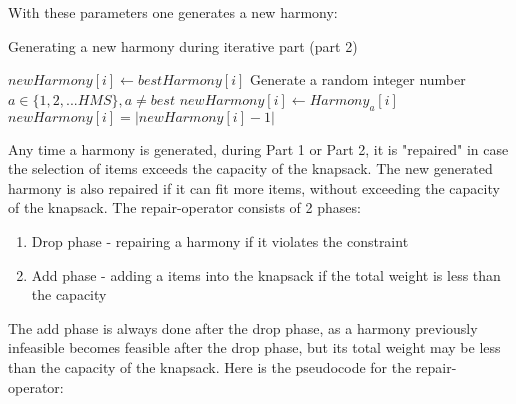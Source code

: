 \documentclass[titlepage]{article}
\begin{document}
With these parameters one generates a new harmony:

\begin{breakablealgorithm}
\caption{Generating a new harmony during iterative part (part 2)}\label{harmonyGen}
    \begin{algorithmic}[1]
                \State $newHarmony[i] \gets bestHarmony[i]$ 
            \Else
                \State Generate a random integer number $a \in \{1, 2, ... HMS\}, a \neq best$
                \State $newHarmony[i] \gets Harmony_{a}[i]$ 
                    \State $newHarmony[i] = |newHarmony[i]-1|$ 
                \EndIf
            \EndIf
        \EndFor
    \end{algorithmic}
\end{breakablealgorithm}


Any time a harmony is generated, during Part 1 or Part 2, it is "repaired" in case the selection of items exceeds the capacity of the knapsack. The new generated harmony is also repaired if it can fit more items, without exceeding the capacity of the knapsack. The repair-operator consists of 2 phases:
\begin{enumerate}
    \item Drop phase - repairing a harmony if it violates the constraint
    \item Add phase - adding a items into the knapsack if the total weight is less than the capacity
\end{enumerate}

The add phase is always done after the drop phase, as a harmony previously infeasible becomes feasible after the drop phase, but its total weight may be less than the capacity of the knapsack. Here is the pseudocode for the repair-operator:
\end{document}
